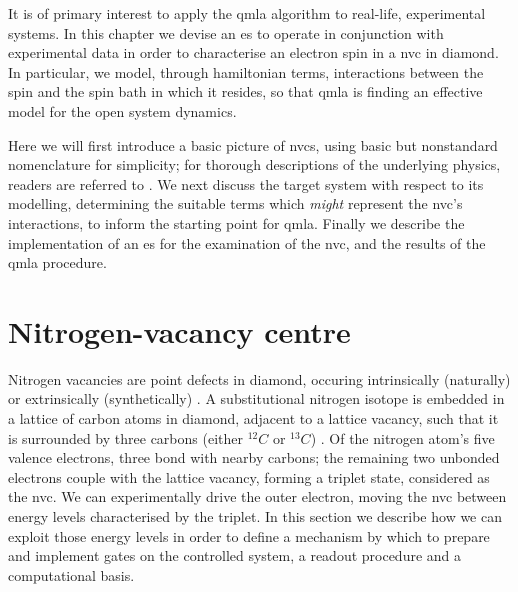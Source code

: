
It is of primary interest to apply the \gls{qmla} algorithm to real-life, experimental systems. 
In this chapter we devise an \gls{es} to operate in conjunction with experimental data 
    in order to characterise an electron spin in a \gls{nvc} in diamond.
In particular, we model, through \gls{hamiltonian} terms, interactions between the spin and 
    the spin bath in which it resides,
    so that \gls{qmla} is finding an effective model for the open system dynamics.
\par

Here we will first introduce a basic picture of \glspl{nvc}, 
    using basic but nonstandard nomenclature for simplicity;
    for thorough descriptions of the underlying physics, readers are referred to \cite{doherty2013nitrogen}.
We next discuss the target system with respect to its modelling, 
    determining the suitable terms which \emph{might} represent the \gls{nvc}'s interactions, 
    to inform the starting point for \gls{qmla}.
Finally we describe the implementation of an \gls{es} for the examination of the \gls{nvc},
    and the results of the \gls{qmla} procedure. 

\section{Nitrogen-vacancy centre}
\label{sec:nv_centres}

Nitrogen vacancies are point defects in diamond, 
    occuring intrinsically (naturally) \cite{davies1976optical} or extrinsically (synthetically) \cite{meijer2005generation, edmonds2012production}.
A substitutional \gls{nitrogen} isotope is embedded in a lattice of carbon atoms in diamond, 
    adjacent to a lattice vacancy, 
    such that it is surrounded by three \glspl{carbon} (either $^{12}C$ or $^{13}C$) \cite{lenef1996electronic}. 
Of the \gls{nitrogen} atom's five valence electrons, three bond with nearby \glspl{carbon};
    the remaining two unbonded electrons couple with the lattice vacancy, 
    forming a triplet state, considered as the \gls{nvc}. 
We can experimentally drive the outer electron, moving the \gls{nvc} between energy levels characterised by the triplet. 
In this section we describe how we can exploit those energy levels in order to define a mechanism by which to 
    prepare and implement gates on the controlled system, a readout procedure and a computational basis.

\par 


